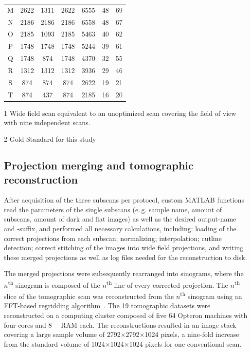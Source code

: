 \begin{threeparttable}
\begin{tabular}{ccccccc}
		M & 2622 & 1311 & 2622 & 6555  &  48 & 69\\
		N & 2186 & 2186 & 2186 & 6558  &  48 & 67\\
		O & 2185 & 1093 & 2185 & 5463  &  40 & 62\\
		P & 1748 & 1748 & 1748 & 5244  &  39 & 61\\
		Q & 1748 & 874  & 1748 & 4370  &  32 & 55\\
		R & 1312 & 1312 & 1312 & 3936  &  29 & 46\\
		S & 874  & 874  & 874  & 2622  &  19 & 21\\
		\rowcolor{lightgray} T & 874  & 437  & 874  & 2185  &  16  & 20\\
		\bottomrule
	\end{tabular}
	\begin{tablenotes}
		\footnotesize
		\item[1] Wide field scan equivalent to an unoptimized scan covering the field of view with nine independent scans.
		\item[2] Gold Standard for this study
	\end{tablenotes}

\end{threeparttable}

\subsection{Projection merging and tomographic reconstruction}
After acquisition of the three subscans per protocol, custom MATLAB functions read the parameters of the single subscans (e.\,g. sample name, amount of subscans, amount of dark and flat images) as well as the desired output-name and -suffix, and performed all necessary calculations, including: loading of the correct projections from each subscan; normalizing; interpolation; cutline detection; correct stitching of the images into wide field projections, and writing these merged projections as well as log files needed for the reconstruction to disk.

The merged projections were subsequently rearranged into sinograms, where the $n$\textsuperscript{th} sinogram is composed of the $n$\textsuperscript{th} line of every corrected projection. The $n$\textsuperscript{th} slice of the tomographic scan was reconstructed from the $n$\textsuperscript{th} sinogram using an FFT-based regridding algorithm~\cite{Dowd1999,Marone2008}. The 19 tomographic datasets were reconstructed on a computing cluster composed of five \SI{64}{\bit} Opteron machines with four cores and \SI{8}{\giga\byte} RAM each. The reconstructions resulted in an image stack covering a large sample volume of 2792$\times$2792$\times$1024 pixels, a nine-fold increase from the standard volume of 1024$\times$1024$\times$1024 pixels for one conventional scan.

